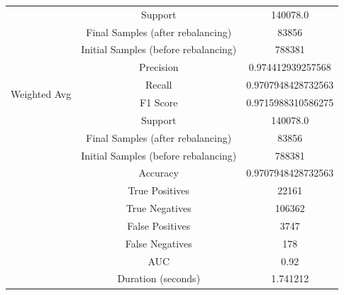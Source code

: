 \begin{longtable}{|c|c|c|}
 & Support & 140078.0 \\
 & Final Samples (after rebalancing) & 83856 \\
 & Initial Samples (before rebalancing) & 788381 \\
\hline
\multirow{4}{*}{Weighted Avg} & Precision & 0.974412939257568 \\
 & Recall & 0.9707948428732563 \\
 & F1 Score & 0.9715988310586275 \\
 & Support & 140078.0 \\
 & Final Samples (after rebalancing) & 83856 \\
 & Initial Samples (before rebalancing) & 788381 \\
\hline
& Accuracy & 0.9707948428732563 \\ \hline
& True Positives & 22161 \\ \hline
& True Negatives & 106362 \\ \hline
& False Positives & 3747 \\ \hline
& False Negatives & 178 \\ \hline
& AUC & 0.92 \\ \hline
& Duration (seconds) & 1.741212 \\ \hline
\end{longtable}


